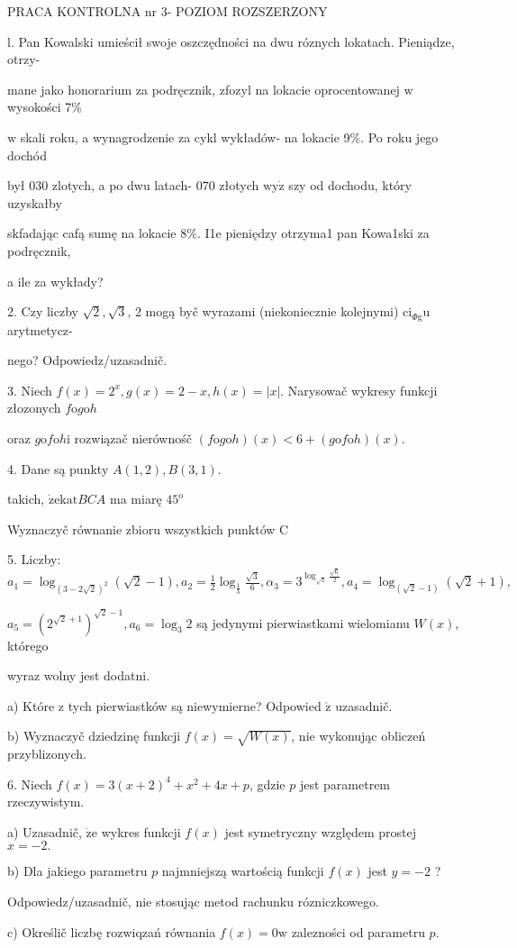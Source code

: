 \documentclass[a4paper,12pt]{article}
\begin{document}
PRACA KONTROLNA nr 3- POZIOM ROZSZERZONY

l. Pan Kowalski umieścił swoje oszczędności na dwu róznych lokatach. Pieniądze, otrzy-

mane jako honorarium za podręcznik, zfozyl na lokacie oprocentowanej $\mathrm{w}$ wysokości 7\%

$\mathrm{w}$ skali roku, a wynagrodzenie za cykl wykładów- na lokacie 9\%. Po roku jego dochód

był $030$ zlotych, a po dwu latach- $070$ złotych $\mathrm{w}\mathrm{y}\dot{\mathrm{z}}$ szy od dochodu, który uzyskałby

skfadając cafą sumę na lokacie 8\%. I1e pieniędzy otrzyma1 pan Kowa1ski za podręcznik,

a ile za wykłady?

2. Czy liczby $\sqrt{2}, \sqrt{3}$, 2 mogą byč wyrazami (niekoniecznie kolejnymi) $\mathrm{c}\mathrm{i}_{\Phi \mathrm{g}}\mathrm{u}$ arytmetycz-

nego? Odpowiedz/uzasadnič.

3. Niech $f(x)=2^{x}, g(x)=2-x, h(x)=|x|$. Narysowač wykresy funkcji złozonych $f\mathrm{o}g\mathrm{o}h$

oraz $g\mathrm{o}f\mathrm{o}h\mathrm{i}$ rozwiązač nierównośč $(f\mathrm{o}g\mathrm{o}h)(x)<6+(g\mathrm{o}f\mathrm{o}h)(x).$

4. Dane są punkty $A(1,2), B(3,1).$

takich, $\dot{\mathrm{z}}\mathrm{e}\mathrm{k}\mathrm{a}\mathrm{t}BCA$ ma miarę $45^{\mathrm{o}}$

Wyznaczyč równanie zbioru wszystkich punktów C

5. Liczby: $a_{1}=\log_{(3-2\sqrt{2})^{2}}(\sqrt{2}-1), a_{2}=\displaystyle \frac{1}{2}\log_{\frac{1}{3}}\frac{\sqrt{3}}{6}, \alpha_{3}=3^{\log_{\sqrt{3}}\frac{\sqrt{6}}{2}}, a_{4}=\log_{(\sqrt{2}-1)}(\sqrt{2}+1),$

$a_{5}=(2^{\sqrt{2}+1})^{\sqrt{2}-1}, a_{6}=\log_{3}2$ są jedynymi pierwiastkami wielomianu $W(x)$, którego

wyraz wolny jest dodatni.

a) Które $\mathrm{z}$ tych pierwiastków są niewymierne? Odpowied $\acute{\mathrm{z}}$ uzasadnič.

b) Wyznaczyč dziedzinę funkcji $f(x)=\sqrt{W(x)}$, nie wykonując obliczeń przyblizonych.

6. Niech $f(x)=3(x+2)^{4}+x^{2}+4x+p$, gdzie $p$ jest parametrem rzeczywistym.

a) Uzasadnič, $\dot{\mathrm{z}}\mathrm{e}$ wykres funkcji $f(x)$ jest symetryczny względem prostej $x=-2.$

b) Dla jakiego parametru $p$ najmniejszą wartością funkcji $f(x)$ jest $y=-2$ ?

Odpowiedz/uzasadnič, nie stosując metod rachunku rózniczkowego.

c) Określič liczbę rozwiqzań równania $f(x)=0\mathrm{w}$ zalezności od parametru $p.$
\end{document}
